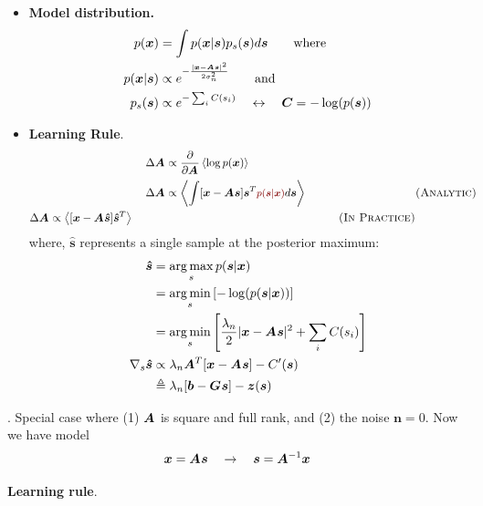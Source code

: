 \documentclass[12pt]{article}
\begin{document}
\myspace
\begin{itemize}
	\item \textbf{Model distribution.}
	\begin{align}
		p(\bm{x}) &= \int p(\bm{x} | \bm{s}) p_s(\bm{s})d\bm{s} \qquad \text{where}\\
		p(\bm{x} | \bm{s}) &\propto e^{-\frac{|\bm{x} - \bm{A}_{}\bm{s}|^2}{2\sigma^2_n}} \qquad \text{and}\\
		p_s(\bm{s}) &\propto e^{-\sum_i C(s_i) } \quad \leftrightarrow \quad \bm{C}_{} = -\log(p(\bm{s}))
	\end{align}
	
	\item \textbf{Learning Rule}. 
	\begin{alignat}{2}
		\Delta\matr{A} 
		&\propto \pderiv{}{\matr{A}}\left<	 \log p(\bm{x}) \right> \\
		\Delta\matr{A} 
		&\propto \left<	 \int [\bm{x} - \matr{A}\bm{s}] \bm{s}^T \mred{ p(\bm{s}|\bm{x}) }d\bm{s}	 \right> \qquad &&\textsc{(Analytic)} \\
		\begin{split}
		\Delta\matr{A} 
		&\propto \left<	 [\bm{x} - \matr{A}\bm{\hat s}] \bm{\hat s}^T\right> \qquad
		\end{split}&&\textsc{(In Practice)} 
	\end{alignat}
	where, $\bm{\hat s}$ represents a single sample at the posterior maximum: 
	\begin{align}
	\bm{\hat s} &= \operatorname*{arg\,max}_s p(\bm s|\bm x) \\
	&= \operatorname*{arg\,min}_s \left[ -\log(p(\bm{s}|\bm{x})) \right] \\
	&= \operatorname*{arg\,min}_s \left[ \frac{\lambda_n}{2} |\bm x - \bm{A}_{}\bm s |^2 + \sum_i C(s_i) \right] \\
	\nabla_s  \bm{\hat s} 
	&\propto \lambda_n \bm{A}_{}^T [\bm x - \bm{A}_{} \bm s] - C'(\bm{s}) \\
	&\triangleq \lambda_n [\bm b - \bm{G}_{} \bm s] - \bm z (\bm s)
	\end{align}
\end{itemize}

\myspace
\p {}. Special case where (1) $\bm{A}_{}$ is square and full rank, and (2) the noise $\bm{n} = 0$. Now we have model
\begin{align}
\bm{x} = \bm{A}_{}\bm{s} \quad \rightarrow \quad \bm{s} = \bm{A}_{}^{-1}\bm{x}
\end{align}

\textbf{Learning rule}.
\end{document}

